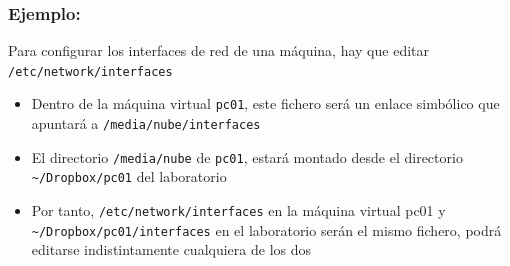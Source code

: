 \documentclass[ucs]{beamer}
\begin{document}
\begin{frame}[fragile]
\frametitle{Ejemplo:}

Para configurar los interfaces de red de una máquina, hay que
editar \verb|/etc/network/interfaces|
\begin{itemize}
\item
Dentro de la máquina virtual \verb|pc01|, este fichero será un
enlace simbólico que apuntará a \verb|/media/nube/interfaces|
\item
El directorio \verb|/media/nube| de \verb|pc01|, estará montado
desde el directorio \verb|~/Dropbox/pc01| del laboratorio
\item
Por tanto, \verb|/etc/network/interfaces| en la máquina
virtual pc01 y \verb|~/Dropbox/pc01/interfaces| en el laboratorio
serán el mismo fichero, podrá editarse indistintamente cualquiera de los dos
\end{itemize}

\end{frame}


%
%
%
%
%
\end{document}
